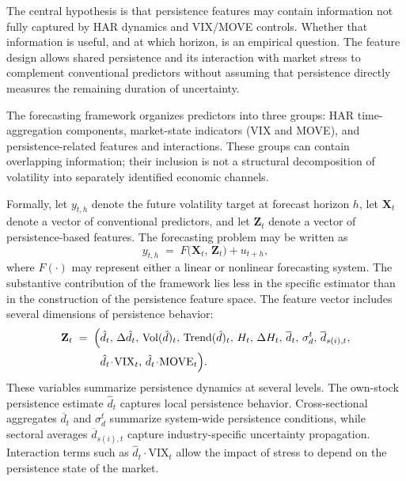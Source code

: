 \documentclass[jrfm,article,submit,moreauthors,pdftex]{Definitions/mdpi}
\begin{document}
The central hypothesis is that persistence features may contain information
not fully captured by HAR dynamics and VIX/MOVE controls. Whether that
information is useful, and at which horizon, is an empirical question. The
feature design allows shared persistence and its interaction with market
stress to complement conventional predictors without assuming that
persistence directly measures the remaining duration of uncertainty.

The forecasting framework organizes predictors into three groups: HAR
time-aggregation components, market-state indicators (VIX and MOVE), and
persistence-related features and interactions. These groups can contain
overlapping information; their inclusion is not a structural decomposition
of volatility into separately identified economic channels.

Formally, let $y_{t,h}$ denote the future volatility target at forecast
horizon $h$, let $\mathbf X_t$ denote a vector of conventional predictors,
and let $\mathbf Z_t$ denote a vector of persistence-based features. The
forecasting problem may be written as
\begin{equation}
  y_{t,h} \;=\; F\!\bigl(\mathbf X_t,\, \mathbf Z_t\bigr) + u_{t+h},
\end{equation}
where $F(\cdot)$ may represent either a linear or nonlinear forecasting
system. The substantive contribution of the framework lies less in the
specific estimator than in the construction of the persistence feature
space. The feature vector includes several dimensions of persistence
behavior:
\begin{equation}
\begin{split}
\mathbf{Z}_t \; = \; \Bigl( & \hat{d}_t, \, \Delta\hat{d}_t, \, \mathrm{Vol}(\hat{d})_t, \, \mathrm{Trend}(\hat{d})_t, \, H_t, \, \Delta H_t, \, \overline{d}_t, \, \sigma_d^t, \, \overline{d}_{s(i),t}, \\
& \hat{d}_t \!\cdot\! \mathrm{VIX}_t, \, \hat{d}_t \!\cdot\! \mathrm{MOVE}_t \Bigr).
\end{split}
\end{equation}
These variables summarize persistence dynamics at several levels. The
own-stock persistence estimate $ \hat{d}_t$ captures local persistence
behavior. Cross-sectional aggregates $\overline d_t$ and $\sigma_d^t$
summarize system-wide persistence conditions, while sectoral averages
$\overline d_{s(i),t}$ capture industry-specific uncertainty propagation.
Interaction terms such as $ \hat{d}_t\!\cdot\!\mathrm{VIX}_t$ allow the impact of
stress to depend on the persistence state of the market.
\end{document}
